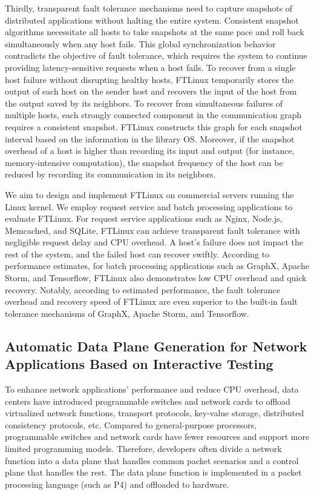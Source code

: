 Thirdly, transparent fault tolerance mechanisms need to capture snapshots of distributed applications without halting the entire system. Consistent snapshot algorithms necessitate all hosts to take snapshots at the same pace and roll back simultaneously when any host fails. This global synchronization behavior contradicts the objective of fault tolerance, which requires the system to continue providing latency-sensitive requests when a host fails. To recover from a single host failure without disrupting healthy hosts, FTLinux temporarily stores the output of each host on the sender host and recovers the input of the host from the output saved by its neighbors. To recover from simultaneous failures of multiple hosts, each strongly connected component in the communication graph requires a consistent snapshot. FTLinux constructs this graph for each snapshot interval based on the information in the library OS. Moreover, if the snapshot overhead of a host is higher than recording its input and output (for instance, memory-intensive computation), the snapshot frequency of the host can be reduced by recording its communication in its neighbors.

We aim to design and implement FTLinux on commercial servers running the Linux kernel. We employ request service and batch processing applications to evaluate FTLinux. For request service applications such as Nginx, Node.js, Memcached, and SQLite, FTLinux can achieve transparent fault tolerance with negligible request delay and CPU overhead. A host's failure does not impact the rest of the system, and the failed host can recover swiftly. According to performance estimates, for batch processing applications such as GraphX, Apache Storm, and Tensorflow, FTLinux also demonstrates low CPU overhead and quick recovery. Notably, according to estimated performance, the fault tolerance overhead and recovery speed of FTLinux are even superior to the built-in fault tolerance mechanisms of GraphX, Apache Storm, and Tensorflow.

\subsection{Automatic Data Plane Generation for Network Applications Based on Interactive Testing}

To enhance network applications' performance and reduce CPU overhead, data centers have introduced programmable switches and network cards to offload virtualized network functions, transport protocols, key-value storage, distributed consistency protocols, etc. Compared to general-purpose processors, programmable switches and network cards have fewer resources and support more limited programming models. Therefore, developers often divide a network function into a data plane that handles common packet scenarios and a control plane that handles the rest. The data plane function is implemented in a packet processing language (such as P4) and offloaded to hardware.

